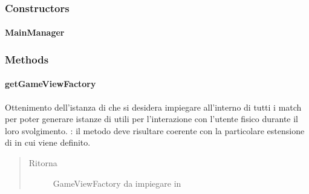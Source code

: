 \documentclass[letterpaper,10pt,italian,openany,oneside]{sphinxmanual}
\begin{document}
\subsubsection{Constructors}
\label{\detokenize{test/it/unicam/cs/pa/mastermind/gamecore/MainManager:constructors}}

\paragraph{MainManager}
\label{\detokenize{test/it/unicam/cs/pa/mastermind/gamecore/MainManager:id1}}

\begin{fulllineitems}
\label{\detokenize{test/it/unicam/cs/pa/mastermind/gamecore/MainManager:it.unicam.cs.pa.mastermind.gamecore.MainManager.MainManager()}}
\end{fulllineitems}



\subsubsection{Methods}
\label{\detokenize{test/it/unicam/cs/pa/mastermind/gamecore/MainManager:methods}}

\paragraph{getGameViewFactory}
\label{\detokenize{test/it/unicam/cs/pa/mastermind/gamecore/MainManager:getgameviewfactory}}

\begin{fulllineitems}
\label{\detokenize{test/it/unicam/cs/pa/mastermind/gamecore/MainManager:it.unicam.cs.pa.mastermind.gamecore.MainManager.getGameViewFactory()}}
Ottenimento dell’istanza di  che si desidera impiegare all’interno di tutti i match per poter generare istanze di  utili per l’interazione con l’utente fisico durante il loro svolgimento. : il metodo deve risultare coerente con la particolare estensione di  in cui viene definito.
\begin{quote}\begin{description}
\item[{Ritorna}] \leavevmode
GameViewFactory da impiegare in 

\end{description}\end{quote}

\end{fulllineitems}
\end{document}
